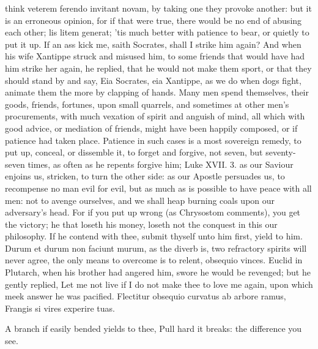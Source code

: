 {think veterem ferendo invitant novam, by taking one they provoke
another: but it is an erroneous opinion, for if that were true, there
would be no end of abusing each other; lis litem generat; 'tis much
better with patience to bear, or quietly to put it up. If an ass kick
me, saith Socrates, shall I strike him again? And when his wife
Xantippe struck and misused him, to some friends that would have had
him strike her again, he replied, that he would not make them sport, or
that they should stand by and say, Eia Socrates, eia Xantippe, as we do
when dogs fight, animate them the more by clapping of hands. Many men
spend themselves, their goods, friends, fortunes, upon small quarrels,
and sometimes at other men's procurements, with much vexation of spirit
and anguish of mind, all which with good advice, or mediation of
friends, might have been happily composed, or if patience had taken
place. Patience in such cases is a most sovereign remedy, to put up,
conceal, or dissemble it, to forget and forgive, not seven,
but seventy-seven times, as often as he repents forgive him; Luke XVII.
3. as our Saviour enjoins us, stricken, to turn the other side: as our
Apostle persuades us, to recompense no man evil for evil, but as
much as is possible to have peace with all men: not to avenge
ourselves, and we shall heap burning coals upon our adversary's head.
For if you put up wrong (as Chrysostom comments), you get the
victory; he that loseth his money, loseth not the conquest in this our
philosophy. If he contend with thee, submit thyself unto him first,
yield to him. Durum et durum non faciunt murum, as the diverb is, two
refractory spirits will never agree, the only means to overcome is to
relent, obsequio vinces. Euclid in Plutarch, when his brother had
angered him, swore he would be revenged; but he gently replied,
Let me not live if I do not make thee to love me again, upon
which meek answer he was pacified.
Flectitur obsequio curvatus ab arbore ramus,
Frangis si vires experire tuas.

A branch if easily bended yields to thee,
Pull hard it breaks: the difference you see.

}
